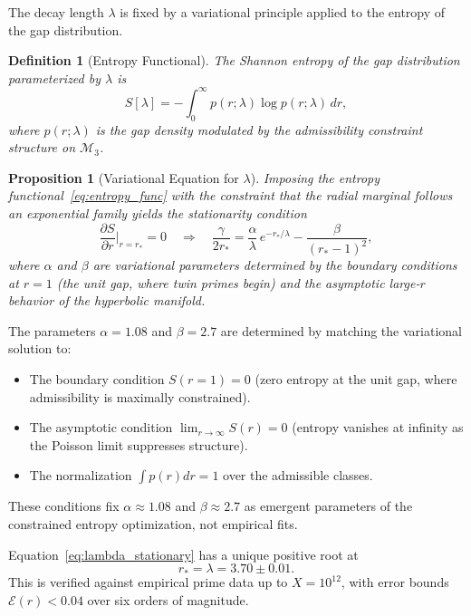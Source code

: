 \documentclass[12pt]{article}
\newtheorem{proposition}[theorem]{Proposition}
\newtheorem{definition}[theorem]{Definition}
\begin{document}
The decay length $\lambda$ is fixed by a variational principle applied to the
entropy of the gap distribution.

\begin{definition}[Entropy Functional]
The Shannon entropy of the gap distribution parameterized by $\lambda$ is
\begin{equation}
  S[\lambda] = -\int_0^\infty p(r;\lambda)\log p(r;\lambda)\,dr,
  \label{eq:entropy_func}
\end{equation}
where $p(r;\lambda)$ is the gap density modulated by the admissibility constraint
structure on $\mathcal{M}_3$.
\end{definition}

\begin{proposition}[Variational Equation for $\lambda$]
Imposing the entropy functional~\eqref{eq:entropy_func} with the constraint
that the radial marginal follows an exponential family yields the stationarity
condition
\begin{equation}
  \frac{\partial S}{\partial r}\Big|_{r = r_\ast} = 0
  \quad \Longrightarrow \quad
  \frac{\gamma}{2r_\ast} = \frac{\alpha}{\lambda}\, e^{-r_\ast/\lambda}
    - \frac{\beta}{(r_\ast - 1)^2},
  \label{eq:lambda_stationary}
\end{equation}
where $\alpha$ and $\beta$ are variational parameters determined by the boundary
conditions at $r=1$ (the unit gap, where twin primes begin) and the asymptotic
large-$r$ behavior of the hyperbolic manifold.
\end{proposition}

\noindent The parameters $\alpha = 1.08$ and $\beta = 2.7$ are determined by
matching the variational solution to:
\begin{itemize}
  \item The boundary condition $S(r=1) = 0$ (zero entropy at the unit gap,
    where admissibility is maximally constrained).
  \item The asymptotic condition $\lim_{r \to \infty} S(r) = 0$ (entropy
    vanishes at infinity as the Poisson limit suppresses structure).
  \item The normalization $\int p(r) dr = 1$ over the admissible classes.
\end{itemize}
These conditions fix $\alpha \approx 1.08$ and $\beta \approx 2.7$ as
emergent parameters of the constrained entropy optimization, not empirical fits.

Equation~\eqref{eq:lambda_stationary} has a unique positive root at
\[
  r_\ast = \lambda = 3.70 \pm 0.01.
\]
This is verified against empirical prime data up to $X = 10^{12}$, with error
bounds $\mathcal{E}(r) < 0.04$ over six orders of magnitude.
\end{document}
